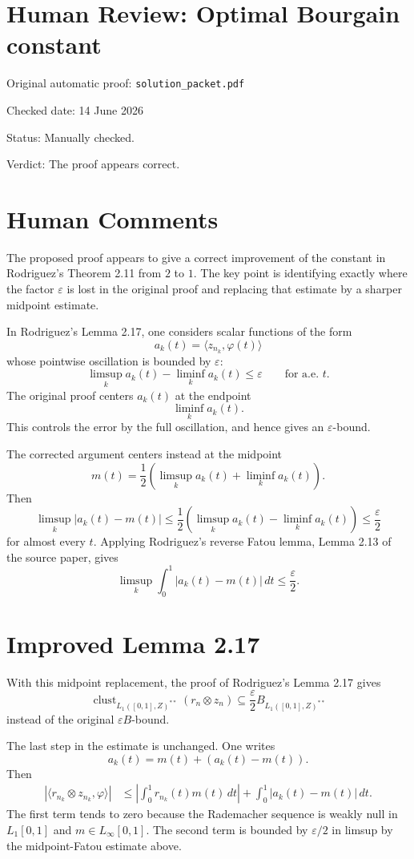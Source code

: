 \documentclass[11pt]{article}
\newcommand{\eps}{\varepsilon}
\newcommand{\clust}{\operatorname{clust}}
\begin{document}
\section*{Human Review: Optimal Bourgain constant}

\noindent Original automatic proof: \texttt{solution\_packet.pdf}

\noindent Checked date: 14 June 2026

\noindent Status: Manually checked.

\noindent Verdict: The proof appears correct.

\section*{Human Comments}

The proposed proof appears to give a correct improvement of the constant in
Rodriguez's Theorem 2.11 from \(2\) to \(1\). The key point is identifying
exactly where the factor \(\eps\) is lost in the original proof and replacing
that estimate by a sharper midpoint estimate.

In Rodriguez's Lemma 2.17, one considers scalar functions of the form
\[
  a_k(t)=\langle z_{n_k},\varphi(t)\rangle
\]
whose pointwise oscillation is bounded by \(\eps\):
\[
  \limsup_k a_k(t)-\liminf_k a_k(t)\leq \eps
  \qquad\text{for a.e. }t.
\]
The original proof centers \(a_k(t)\) at the endpoint
\[
  \liminf_k a_k(t).
\]
This controls the error by the full oscillation, and hence gives an
\(\eps\)-bound.

The corrected argument centers instead at the midpoint
\[
  m(t)=\frac12\left(\limsup_k a_k(t)+\liminf_k a_k(t)\right).
\]
Then
\[
  \limsup_k |a_k(t)-m(t)|
  \leq
  \frac12\left(\limsup_k a_k(t)-\liminf_k a_k(t)\right)
  \leq \frac{\eps}{2}
\]
for almost every \(t\). Applying Rodriguez's reverse Fatou lemma, Lemma 2.13
of the source paper, gives
\[
  \limsup_k\int_0^1 |a_k(t)-m(t)|\,dt\leq \frac{\eps}{2}.
\]

\section*{Improved Lemma 2.17}

With this midpoint replacement, the proof of Rodriguez's Lemma 2.17 gives
\[
  \clust_{L_1([0,1],Z)^{**}}(r_n\otimes z_n)
  \subseteq
  \frac{\eps}{2}B_{L_1([0,1],Z)^{**}}
\]
instead of the original \(\eps B\)-bound.

The last step in the estimate is unchanged. One writes
\[
  a_k(t)=m(t)+(a_k(t)-m(t)).
\]
Then
\[
\begin{aligned}
  |\langle r_{n_k}\otimes z_{n_k},\varphi\rangle|
  &\leq
  \left|\int_0^1 r_{n_k}(t)m(t)\,dt\right|
  +
  \int_0^1 |a_k(t)-m(t)|\,dt.
\end{aligned}
\]
The first term tends to zero because the Rademacher sequence is weakly null in
\(L_1[0,1]\) and \(m\in L_\infty[0,1]\). The second term is bounded by
\(\eps/2\) in limsup by the midpoint-Fatou estimate above.
\end{document}
